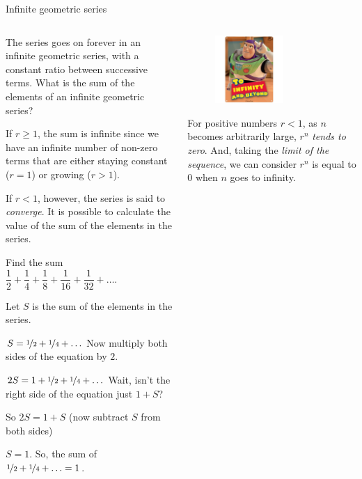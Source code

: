 \documentclass[9pt,aspectratio=169]{beamer}
\begin{document}
\begin{frame}{Infinite geometric series}
  \begin{columns}[T]
    \begin{column}{0.5\textwidth}
      The series goes on forever in an infinite geometric series, with a constant ratio between successive terms.  What is the sum of the elements of an infinite geometric series?

      If $r \geq 1$, the sum is infinite since we have an infinite number of non-zero terms that are either staying constant ($r = 1$) or growing ($r > 1$).
      
      If $r < 1$, however, the series is said to \emph{converge}. It is possible to calculate the value of the sum of the elements in the series.

      \begin{problem}
        Find the sum $\dfrac{1}{2} + \dfrac{1}{4} + \dfrac{1}{8} + \dfrac{1}{16} + \dfrac{1}{32} + \ldots$. 
      \end{problem}

      Let $S$ is the sum of the elements in the series.
      
      $S = \nicefrac{1}{2} + \nicefrac{1}{4} + \ldots$ Now multiply both sides of the equation by $2$.
      
      $2S = 1 + \nicefrac{1}{2} + \nicefrac{1}{4} + \ldots$ Wait, isn’t the right side of the equation just $1 + S$?
      
      So $2S = 1 + S$ (now subtract $S$ from both sides)
      
      $S = 1$.  So, the sum of $\nicefrac{1}{2} + \nicefrac{1}{4} + \ldots = 1$.

    \end{column}
    \begin{column}{0.5\textwidth}
      \begin{figure}
        \vspace*{-1.5em}
        \hspace*{-2em}
        \includegraphics[width=0.6\textwidth]{07 - Geometric Sequences/infinity.jpg}
      \end{figure}
      For positive numbers $r < 1$, as $n$ becomes arbitrarily large, $r^n$ \emph{tends to zero}. And, taking the \emph{limit of the sequence}, we can consider $r^n$ is equal to $0$ when $n$ goes to infinity.
      

\end{column}
\end{columns}
\end{frame}
\end{document}
